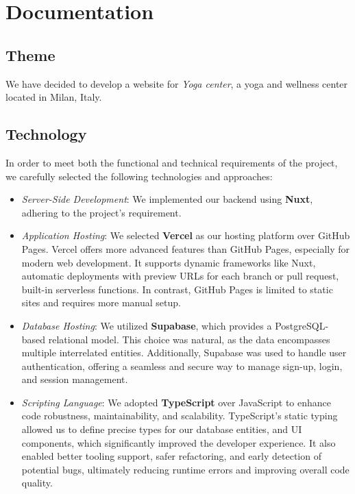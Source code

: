 \section{Documentation}
\subsection{Theme}
We have decided to develop a website for \textit{Yoga center}, a yoga and wellness center located in Milan, Italy.


\subsection{Technology}
In order to meet both the functional and technical requirements of the project, we carefully selected the following technologies and approaches:
\begin{itemize}
    \item \textit{Server-Side Development}: We implemented our backend using \textbf{Nuxt}, adhering to the project’s requirement.
    \item \textit{Application Hosting}: We selected \textbf{Vercel} as our hosting platform over GitHub Pages. Vercel offers more
            advanced features than GitHub Pages, especially for modern web development. It supports dynamic frameworks
            like Nuxt, automatic deployments with preview URLs for each branch or pull request, built-in serverless
            functions. In contrast, GitHub Pages is limited to static sites and requires
            more manual setup.

    \item \textit{Database Hosting}: We utilized \textbf{Supabase}, which provides a PostgreSQL-based relational model.
            This choice was natural, as the data encompasses multiple interrelated entities. Additionally, Supabase was used to handle user authentication, offering a seamless and secure way to manage sign-up, login, and session management.
    \item \textit{Scripting Language}: We adopted \textbf{TypeScript} over JavaScript to enhance code robustness,
            maintainability, and scalability. TypeScript’s static typing allowed us to define precise types for our
            database entities, and UI components, which significantly improved the developer experience. It also enabled
            better tooling support, safer refactoring, and early detection of potential bugs, ultimately reducing
            runtime errors and improving overall code quality.
\end{itemize}

